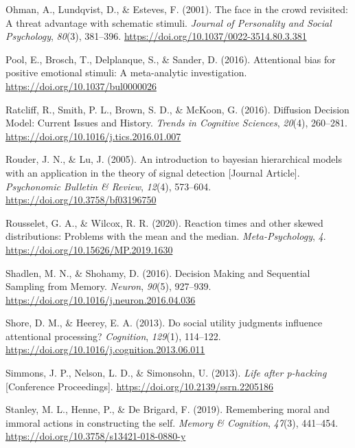 \documentclass[
  man]{apa6}
\newlength{\cslhangindent}
\newlength{\cslentryspacingunit} %
\newenvironment{CSLReferences}[2] %
 {%
  \setlength{\parindent}{0pt}
  \ifodd #1
  \let\oldpar\par
  \def\par{\hangindent=\cslhangindent\oldpar}
  \fi
  \setlength{\parskip}{#2\cslentryspacingunit}
 }%
 {}
\begin{document}
\begin{CSLReferences}{1}{0}
\leavevmode{}%
Ohman, A., Lundqvist, D., \& Esteves, F. (2001). The face in the crowd revisited: A threat advantage with schematic stimuli. \emph{Journal of Personality and Social Psychology}, \emph{80}(3), 381--396. \url{https://doi.org/10.1037/0022-3514.80.3.381}

\leavevmode{}%
Pool, E., Brosch, T., Delplanque, S., \& Sander, D. (2016). Attentional bias for positive emotional stimuli: A meta-analytic investigation. \url{https://doi.org/10.1037/bul0000026}

\leavevmode{}%
Ratcliff, R., Smith, P. L., Brown, S. D., \& McKoon, G. (2016). Diffusion {Decision} {Model}: {Current} {Issues} and {History}. \emph{Trends in Cognitive Sciences}, \emph{20}(4), 260--281. \url{https://doi.org/10.1016/j.tics.2016.01.007}

\leavevmode{}%
Rouder, J. N., \& Lu, J. (2005). An introduction to bayesian hierarchical models with an application in the theory of signal detection {[}Journal Article{]}. \emph{Psychonomic Bulletin \& Review}, \emph{12}(4), 573--604. \url{https://doi.org/10.3758/bf03196750}

\leavevmode{}%
Rousselet, G. A., \& Wilcox, R. R. (2020). Reaction times and other skewed distributions: Problems with the mean and the median. \emph{Meta-Psychology}, \emph{4}. \url{https://doi.org/10.15626/MP.2019.1630}

\leavevmode{}%
Shadlen, M. N., \& Shohamy, D. (2016). Decision {Making} and {Sequential} {Sampling} from {Memory}. \emph{Neuron}, \emph{90}(5), 927--939. \url{https://doi.org/10.1016/j.neuron.2016.04.036}

\leavevmode{}%
Shore, D. M., \& Heerey, E. A. (2013). Do social utility judgments influence attentional processing? \emph{Cognition}, \emph{129}(1), 114--122. \url{https://doi.org/10.1016/j.cognition.2013.06.011}

\leavevmode{}%
Simmons, J. P., Nelson, L. D., \& Simonsohn, U. (2013). \emph{Life after p-hacking} {[}Conference Proceedings{]}. \url{https://doi.org/10.2139/ssrn.2205186}

\leavevmode{}%
Stanley, M. L., Henne, P., \& De Brigard, F. (2019). Remembering moral and immoral actions in constructing the self. \emph{Memory \& Cognition}, \emph{47}(3), 441--454. \url{https://doi.org/10.3758/s13421-018-0880-y}


\end{CSLReferences}
\end{document}
